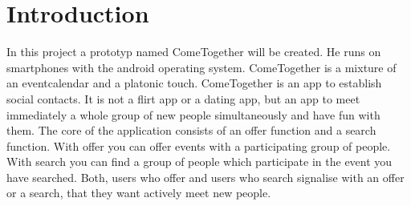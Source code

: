 \section{Introduction}\label{sec:Introduction}
In this project a prototyp named ComeTogether will be created. He runs on smartphones with the android operating system. ComeTogether is a mixture of an eventcalendar and a platonic touch. ComeTogether is an app to establish social contacts. It is not a flirt app or a dating app, but an app to meet immediately a whole group of new people simultaneously and have fun with them. The core of the application consists of an offer function and a search function. With offer you can offer events with a participating group of people. With search you can find a group of people which participate in the event you have searched. Both, users who offer and users who search signalise with an offer or a search, that they want actively meet new people.
